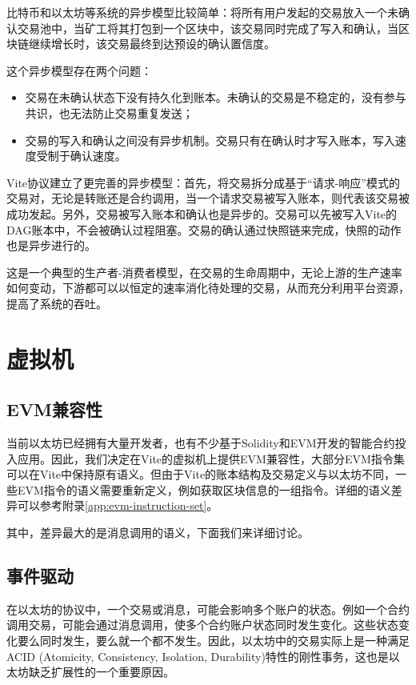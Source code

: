 \documentclass[UTF8,nofonts]{ctexart}
\begin{document}
\begin{multicols}{2}
比特币和以太坊等系统的异步模型比较简单：将所有用户发起的交易放入一个未确认交易池中，当矿工将其打包到一个区块中，该交易同时完成了写入和确认，当区块链继续增长时，该交易最终到达预设的确认置信度。

这个异步模型存在两个问题：
\begin{itemize}
	\item 交易在未确认状态下没有持久化到账本。未确认的交易是不稳定的，没有参与共识，也无法防止交易重复发送；
	\item 交易的写入和确认之间没有异步机制。交易只有在确认时才写入账本，写入速度受制于确认速度。
\end{itemize}

Vite协议建立了更完善的异步模型：首先，将交易拆分成基于“请求-响应”模式的交易对，无论是转账还是合约调用，当一个请求交易被写入账本，则代表该交易被成功发起。另外，交易被写入账本和确认也是异步的。交易可以先被写入Vite的DAG账本中，不会被确认过程阻塞。交易的确认通过快照链来完成，快照的动作也是异步进行的。

这是一个典型的生产者-消费者模型，在交易的生命周期中，无论上游的生产速率如何变动，下游都可以以恒定的速率消化待处理的交易，从而充分利用平台资源，提高了系统的吞吐。

\section{虚拟机}
\subsection{EVM兼容性}
当前以太坊已经拥有大量开发者，也有不少基于Solidity和EVM开发的智能合约投入应用。因此，我们决定在Vite的虚拟机上提供EVM兼容性，大部分EVM指令集可以在Vite中保持原有语义。但由于Vite的账本结构及交易定义与以太坊不同，一些EVM指令的语义需要重新定义，例如获取区块信息的一组指令。详细的语义差异可以参考附录\ref{app:evm-instruction-set}。

其中，差异最大的是消息调用的语义，下面我们来详细讨论。

\subsection{事件驱动}
在以太坊的协议中，一个交易或消息，可能会影响多个账户的状态。例如一个合约调用交易，可能会通过消息调用，使多个合约账户状态同时发生变化。这些状态变化要么同时发生，要么就一个都不发生。因此，以太坊中的交易实际上是一种满足 ACID (Atomicity, Consistency, Isolation, Durability)\cite{Haerder:1983:PTD:289.291}特性的刚性事务，这也是以太坊缺乏扩展性的一个重要原因。


\end{multicols}
\end{document}
